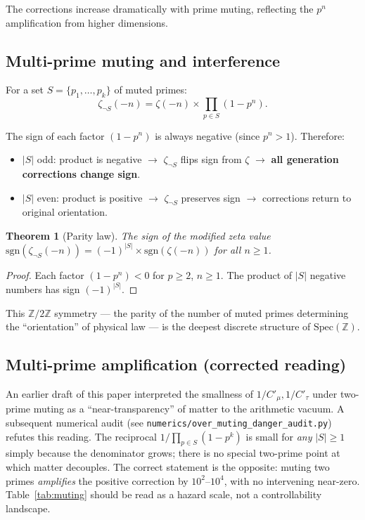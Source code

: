 \documentclass[11pt,a4paper]{article}
\newtheorem{theorem}{Theorem}
\newcommand{\Spec}{\mathrm{Spec}}
\begin{document}
The corrections increase dramatically with prime muting,
reflecting the $p^n$ amplification from higher dimensions.

\subsection{Multi-prime muting and interference}

For a set $S = \{p_1, \ldots, p_k\}$ of muted primes:
\begin{equation}
  \zeta_{\neg S}(-n) = \zeta(-n) \times \prod_{p \in S} (1 - p^n).
\end{equation}

The sign of each factor $(1 - p^n)$ is always negative
(since $p^n > 1$). Therefore:
\begin{itemize}
\item $|S|$ odd: product is negative $\to$ $\zeta_{\neg S}$
  flips sign from $\zeta$ $\to$ \textbf{all generation corrections
  change sign}.
\item $|S|$ even: product is positive $\to$ $\zeta_{\neg S}$
  preserves sign $\to$ corrections return to original orientation.
\end{itemize}

\begin{theorem}[Parity law]
\label{thm:parity}
The sign of the modified zeta value
$\mathrm{sgn}(\zeta_{\neg S}(-n)) = (-1)^{|S|} \times
\mathrm{sgn}(\zeta(-n))$ for all $n \geq 1$.
\end{theorem}

\begin{proof}
Each factor $(1 - p^n) < 0$ for $p \geq 2$, $n \geq 1$.
The product of $|S|$ negative numbers has sign $(-1)^{|S|}$.
\end{proof}

This $\mathbb{Z}/2\mathbb{Z}$ symmetry --- the parity of the
number of muted primes determining the ``orientation'' of physical
law --- is the deepest discrete structure of $\Spec(\mathbb{Z})$.

\subsection{Multi-prime amplification (corrected reading)}
\label{sec:multi_prime_amplification}

An earlier draft of this paper interpreted the smallness of
$1/C'_\mu, 1/C'_\tau$ under two-prime muting as a ``near-transparency''
of matter to the arithmetic vacuum. A subsequent numerical audit
(see \texttt{numerics/over\_muting\_danger\_audit.py}) refutes this
reading. The reciprocal $1/\prod_{p\in S}(1-p^k)$ is small for
\emph{any} $|S|\geq 1$ simply because the denominator grows; there
is no special two-prime point at which matter decouples. The
correct statement is the opposite: muting two primes
\emph{amplifies} the positive correction by $10^2$--$10^4$, with no
intervening near-zero. Table~\ref{tab:muting} should be read as a
hazard scale, not a controllability landscape.
\end{document}
